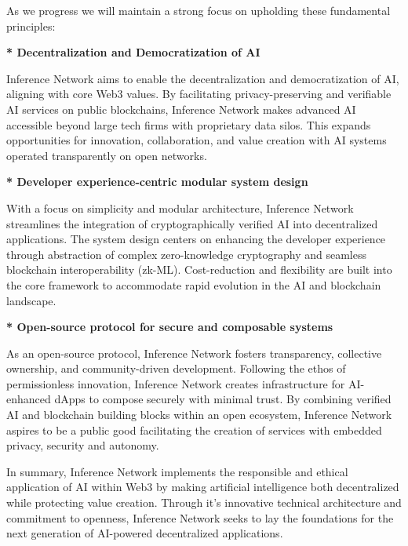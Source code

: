 \documentclass[conference]{IEEEtran}
\begin{document}
As we progress we will maintain a strong focus on upholding these fundamental principles:

\textbf{* Decentralization and Democratization of AI}

Inference Network aims to enable the decentralization and democratization of AI, aligning with core Web3 values. By facilitating privacy-preserving and veriﬁable AI services on public blockchains, Inference Network makes advanced AI accessible beyond large tech ﬁrms with proprietary data silos. This expands opportunities for innovation, collaboration, and value creation with AI systems operated transparently on open networks.

\textbf{* Developer experience-centric modular system design}

With a focus on simplicity and modular architecture, Inference Network streamlines the integration of cryptographically veriﬁed AI into decentralized applications. The system design centers on enhancing the developer experience through abstraction of complex zero-knowledge cryptography and seamless blockchain interoperability (zk-ML). Cost-reduction and ﬂexibility are built into the core framework to accommodate rapid evolution in the AI and blockchain landscape.

\textbf{* Open-source protocol for secure and composable systems}

As an open-source protocol, Inference Network fosters transparency, collective ownership, and community-driven development. Following the ethos of permissionless innovation, Inference Network creates infrastructure for AI-enhanced dApps to compose securely with minimal trust. By combining veriﬁed AI and blockchain building blocks within an open ecosystem, Inference Network aspires to be a public good facilitating the creation of services with embedded privacy, security and autonomy.

In summary, Inference Network implements the responsible and ethical application of AI within Web3 by making artiﬁcial intelligence both decentralized while protecting value creation. Through it’s innovative technical architecture and commitment to openness, Inference Network seeks to lay the foundations for the next generation of AI-powered decentralized applications.



\clearpage







\end{document}
